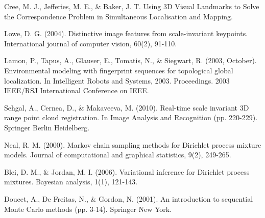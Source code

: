 \documentclass[]{article}
\begin{document}
\begin{thebibliography}{99}
            \newblock Cree, M. J., Jefferies, M. E., \& Baker, J. T. Using 3D Visual Landmarks to Solve the Correspondence Problem in Simultaneous Localisation and Mapping.

            \newblock Lowe, D. G. (2004). Distinctive image features from scale-invariant keypoints. International journal of computer vision, 60(2), 91-110.

            \newblock Lamon, P., Tapus, A., Glauser, E., Tomatis, N., \& Siegwart, R. (2003, October). Environmental modeling with fingerprint sequences for topological global localization. In Intelligent Robots and Systems, 2003. Proceedings. 2003 IEEE/RSJ International Conference on IEEE.


            \newblock Sehgal, A., Cernea, D., \& Makaveeva, M. (2010). Real-time scale invariant 3D range point cloud registration. In Image Analysis and Recognition (pp. 220-229). Springer Berlin Heidelberg.

            \newblock Neal, R. M. (2000). Markov chain sampling methods for Dirichlet process mixture models. Journal of computational and graphical statistics, 9(2), 249-265.

            \newblock Blei, D. M., \& Jordan, M. I. (2006). Variational inference for Dirichlet process mixtures. Bayesian analysis, 1(1), 121-143.


            \newblock Doucet, A., De Freitas, N., \& Gordon, N. (2001). An introduction to sequential Monte Carlo methods (pp. 3-14). Springer New York.




\end{thebibliography}
\end{document}
